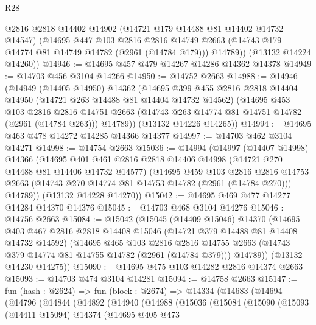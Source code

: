 \begin{lexlean}{R28}
\begin{coremodule}
        @2816
        @2818
        @14402
        @14902
        (@14721 @179 @14488 @81 @14402 @14732 @14547)
        (@14695
          @447
          @103
          @2816
          @2816
          @14749
          @2663
          (@14743 @179 @14774 @81 @14749 @14782 (@2961 (@14784 @179)))
          @14789))
      (@13132 @14224 @14260))
@14946 := @14695 @457 @479 @14267 @14286 @14362 @14378
@14949 := @14703 @456 @3104 @14266
@14950 := @14752 @2663
@14988 := @14946
    (@14949
      (@14405 @14950)
      @14362
      (@14695
        @399
        @455
        @2816
        @2818
        @14404
        @14950
        (@14721 @263 @14488 @81 @14404 @14732 @14562)
        (@14695
          @453
          @103
          @2816
          @2816
          @14751
          @2663
          (@14743 @263 @14774 @81 @14751 @14782 (@2961 (@14784 @263)))
          @14789))
      (@13132 @14226 @14265))
@14994 := @14695 @463 @478 @14272 @14285 @14366 @14377
@14997 := @14703 @462 @3104 @14271
@14998 := @14754 @2663
@15036 := @14994
    (@14997
      (@14407 @14998)
      @14366
      (@14695
        @401
        @461
        @2816
        @2818
        @14406
        @14998
        (@14721 @270 @14488 @81 @14406 @14732 @14577)
        (@14695
          @459
          @103
          @2816
          @2816
          @14753
          @2663
          (@14743 @270 @14774 @81 @14753 @14782 (@2961 (@14784 @270)))
          @14789))
      (@13132 @14228 @14270))
@15042 := @14695 @469 @477 @14277 @14284 @14370 @14376
@15045 := @14703 @468 @3104 @14276
@15046 := @14756 @2663
@15084 := @15042
    (@15045
      (@14409 @15046)
      @14370
      (@14695
        @403
        @467
        @2816
        @2818
        @14408
        @15046
        (@14721 @379 @14488 @81 @14408 @14732 @14592)
        (@14695
          @465
          @103
          @2816
          @2816
          @14755
          @2663
          (@14743 @379 @14774 @81 @14755 @14782 (@2961 (@14784 @379)))
          @14789))
      (@13132 @14230 @14275))
@15090 := @14695 @475 @103 @14282 @2816 @14374 @2663
@15093 := @14703 @474 @3104 @14281
@15094 := @14758 @2663
@15147 := fun (hash : @2624) =>
  fun (block : @2674) =>
  @14334
    (@14683
      (@14694
        (@14796
          (@14844
            (@14892
              (@14940
                (@14988
                  (@15036
                    (@15084
                      (@15090
                        (@15093
                          (@14411 @15094)
                          @14374
                          (@14695
                            @405
                            @473

\end{coremodule}
\end{lexlean}
